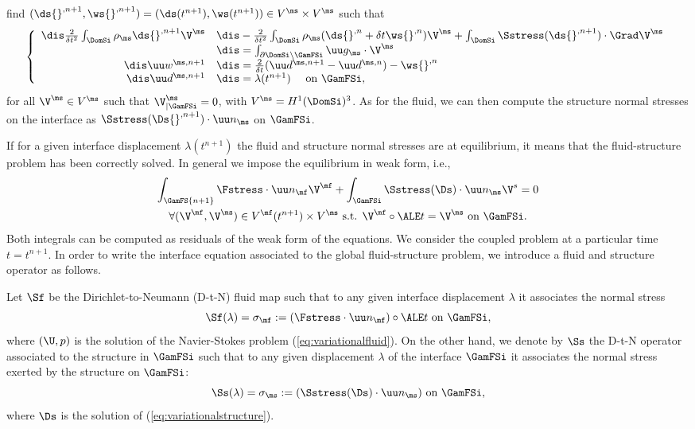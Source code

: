 find $(\ds{}^{,n+1},\ws{}^{,n+1})=(\ds(t^{n+1}),\ws(t^{n+1})) \in V^\ms\times
V^\ms$ such that
\begin{equation} \label{eq:variationalstructure}
\left\{
\begin{array}{rl}
    \dis  \frac{2}{\delta t^2} \int_{\DomSi} \rho_\ms \ds{}^{, n+1} \V^\ms
    &\dis-  \frac{2}{\delta t^2} \int_{\DomSi} \rho_\ms (\ds{}^{, n} + \delta t \ws{}^{, n})\V^\ms
    +  \int_{\DomSi} \Sstress(\ds{}^{, n+1})\cdot \Grad \V^\ms    \\
    &\dis = \int_{\partial\DomSi\setminus\GamFSi} \uu g_\ms \cdot \V^\ms\\
    \dis \uu w^{\ms,n+1} &\dis=  \frac{2}{\delta t}(\uu d^{\ms,n+1} - \uu d^{\ms,n}) - \ws{}^{,n}\\
    \dis\uu d^{\ms,n+1} &\dis =  \lambda(t^{n+1}) \quad\text{ on } \GamFSi,
    \end{array}
\right.
\end{equation}
for all $\V^\ms \in V^\ms$ such that $\V^\ms_{|\GamFSi} = 0$,
with $V^\ms = H^1(\DomSi)^3 $. As for the fluid, we can then compute the structure
normal stresses on the interface  as $\Sstress(\Ds{}^{, n+1}) \cdot {\uu n}_\ms$  on $\GamFSi$.

If for a given interface displacement $\lambda(t^{n+1})$ the fluid and structure normal stresses are
at equilibrium,
it means that the fluid-structure problem has
been correctly solved.
In general we impose the equilibrium in weak form, i.e.,
\begin{multline*}
  \int_{\GamFS{n+1}} \Fstress \cdot \uu n_{\mf}\V^\mf + \int_{\GamFSi}
  \Sstress(\Ds) \cdot \uu n_{\ms} \V^s = 0 \\
  \forall (\V^\mf,
  \V^\ms) \in V^\mf(t^{n+1}) \times V^\ms \text{ s.t. } \V^\mf\circ\ALE t =
  \V^\ms \text{ on } \GamFSi.
\end{multline*}
Both integrals can be computed as residuals of
the weak form of the equations.
We consider the coupled problem at a particular time  $t=t^{n+1}$.
In order to write the interface equation associated to the global
fluid-structure problem, we introduce a fluid and structure operator
as follows.

Let $\Sf$ be the Dirichlet-to-Neumann (D-t-N) fluid map such that to any given interface
displacement $\lambda$ it associates the normal stress
$$
\Sf (\lambda) = \sigma_\mf :=  (\Fstress \cdot {\uu n}_\mf) \circ \ALE t \mbox{ on } \GamFSi,
$$
where $(\U, p)$ is the solution of the Navier-Stokes problem (\ref{eq:variationalfluid}). On the
other hand, we denote by $\Ss$ the D-t-N operator associated to the structure in $\GamFSi$ such
that to any given displacement $\lambda$ of the interface $\GamFSi$ it associates the normal stress
exerted by the structure on $\GamFSi$:
$$
\Ss (\lambda) = \sigma_\ms :=  (\Sstress(\Ds) \cdot {\uu n}_\ms) \mbox{ on } \GamFSi,
$$
where $\Ds$ is the solution of (\ref{eq:variationalstructure}).

